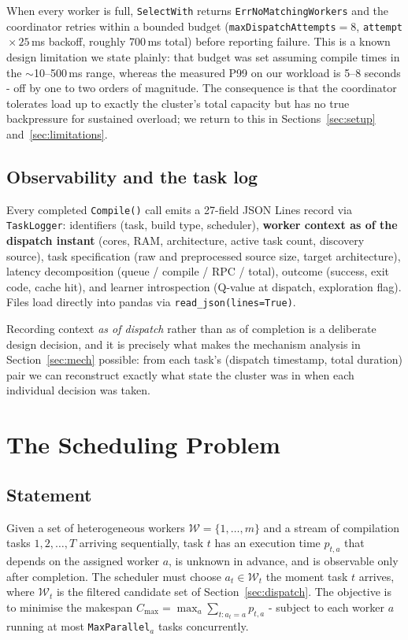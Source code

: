 \documentclass[final,5p,times,twocolumn]{elsarticle}
\begin{document}
When every worker is full, \texttt{SelectWith} returns \texttt{ErrNoMatchingWorkers} and the coordinator retries within a bounded budget (\texttt{maxDispatchAttempts}${}=8$, \texttt{attempt}${}\times25$\,ms backoff, roughly 700\,ms total) before reporting failure. This is a known design limitation we state plainly: that budget was set assuming compile times in the $\sim$10--500\,ms range, whereas the measured P99 on our workload is 5--8 seconds - off by one to two orders of magnitude. The consequence is that the coordinator tolerates load up to exactly the cluster's total capacity but has no true backpressure for sustained overload; we return to this in Sections~\ref{sec:setup} and~\ref{sec:limitations}.

\subsection{Observability and the task log}
\label{sec:log}

Every completed \texttt{Compile()} call emits a 27-field JSON Lines record via \texttt{TaskLogger}: identifiers (task, build type, scheduler), \textbf{worker context as of the dispatch instant} (cores, RAM, architecture, active task count, discovery source), task specification (raw and preprocessed source size, target architecture), latency decomposition (queue / compile / RPC / total), outcome (success, exit code, cache hit), and learner introspection (Q-value at dispatch, exploration flag). Files load directly into pandas via \texttt{read\_json(lines=True)}.

Recording context \emph{as of dispatch} rather than as of completion is a deliberate design decision, and it is precisely what makes the mechanism analysis in Section~\ref{sec:mech} possible: from each task's (dispatch timestamp, total duration) pair we can reconstruct exactly what state the cluster was in when each individual decision was taken.

\section{The Scheduling Problem}
\label{sec:problem}

\subsection{Statement}

Given a set of heterogeneous workers $\mathcal{W}=\{1,\dots,m\}$ and a stream of compilation tasks $1,2,\dots,T$ arriving sequentially, task $t$ has an execution time $p_{t,a}$ that depends on the assigned worker $a$, is unknown in advance, and is observable only after completion. The scheduler must choose $a_t\in\mathcal{W}_t$ the moment task $t$ arrives, where $\mathcal{W}_t$ is the filtered candidate set of Section~\ref{sec:dispatch}. The objective is to minimise the makespan $C_{\max}=\max_a\sum_{t:a_t=a}p_{t,a}$ - subject to each worker $a$ running at most \texttt{MaxParallel}$_a$ tasks concurrently.
\end{document}
